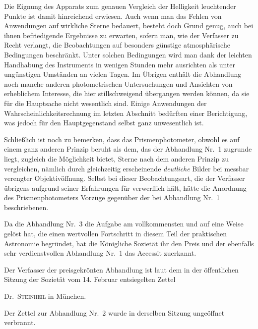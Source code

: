 Die Eignung des Apparats zum genauen Vergleich der Helligkeit leuchtender Punkte ist damit hinreichend erwiesen. Auch wenn man das Fehlen von Anwendungen auf wirkliche Sterne bedauert, besteht doch Grund genug, auch bei ihnen befriedigende Ergebnisse zu erwarten, sofern man, wie der Verfasser zu Recht verlangt, die Beobachtungen auf besonders günstige atmosphärische Bedingungen beschränkt. Unter solchen Bedingungen wird man dank der leichten Handhabung des Instruments in wenigen Stunden mehr ausrichten als unter ungünstigen Umständen an vielen Tagen. Im Übrigen enthält die Abhandlung noch manche anderen photometrischen Untersuchungen und Ansichten von erheblichem Interesse, die hier stillschweigend übergangen werden können, da sie für die Hauptsache nicht wesentlich sind. Einige Anwendungen der Wahrscheinlichkeitsrechnung im letzten Abschnitt bedürften einer Berichtigung, was jedoch für den Hauptgegenstand selbst ganz unwesentlich ist.

Schließlich ist noch zu bemerken, dass das Prismenphotometer, obwohl es auf einem ganz anderen
Prinzip beruht als dem, das der Abhandlung Nr.~1 zugrunde liegt, zugleich die Möglichkeit bietet, Sterne nach dem anderen Prinzip zu vergleichen, nämlich durch gleichzeitig erscheinende \emph{deutliche} Bilder bei messbar verengter Objektivöffnung. Selbst bei dieser Beobachtungsart, die der Verfasser übrigens aufgrund seiner Erfahrungen für verwerflich hält, hätte die Anordnung des Prismenphotometers Vorzüge gegenüber der bei Abhandlung Nr.~1 beschriebenen.

Da die Abhandlung Nr.~3 die Aufgabe am vollkommensten und auf eine Weise gelöst hat, die einen wertvollen Fortschritt in diesem Teil der praktischen Astronomie begründet, hat die Königliche Sozietät ihr den Preis und der ebenfalls sehr verdienstvollen Abhandlung Nr.~1 das Accessit zuerkannt.

Der Verfasser der preisgekrönten Abhandlung ist laut dem in der öffentlichen Sitzung der Sozietät vom 14. Februar entsiegelten Zettel

\begin{center}
Dr.\ \textsc{Steinheil} in München.
\end{center}

Der Zettel zur Abhandlung Nr.~2 wurde in derselben Sitzung ungeöffnet verbrannt.
